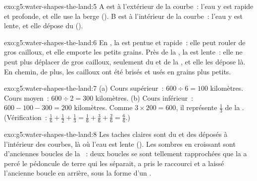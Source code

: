 \begin{solution}{exo:g5:water-shapes-the-land:5}
A est à l'extérieur de la courbe~: l'eau y est rapide et profonde, et elle
use la berge (). B est à l'intérieur de la courbe~: l'eau y est
lente, et elle dépose du  ().
\end{solution}

\begin{solution}{exo:g5:water-shapes-the-land:6}
En , la  est pentue et rapide~: elle peut rouler de gros
cailloux, et elle emporte les petits grains. Près de la , la  est
lente~: elle ne peut plus déplacer de gros cailloux, seulement du  et
de la , et elle les dépose là. En chemin, de plus, les cailloux ont été
brisés et usés en grains plus petits.
\end{solution}

\begin{solution}{exo:g5:water-shapes-the-land:7}
(a) Cours supérieur~: $600 \div 6 = 100$ kilomètres. Cours moyen~:
$600 \div 2 = 300$ kilomètres. (b) Cours inférieur~: $600 - 100 - 300 = 200$
kilomètres. Comme $3 \times 200 = 600$, il représente $\frac{1}{3}$ de la
. (Vérification~: $\frac{1}{6} + \frac{1}{2} + \frac{1}{3} = \frac{1}{6} +
\frac{3}{6} + \frac{2}{6} = \frac{6}{6}$.)
\end{solution}

\begin{solution}{exo:g5:water-shapes-the-land:8}
Les taches claires sont du  et des  déposés à l'intérieur des
courbes, là où l'eau est lente (). Les  sombres en croissant sont
d'anciennes boucles de la ~: deux boucles se sont tellement
rapprochées que la  a percé le pédoncule de terre qui les séparait,
a pris le raccourci et a laissé l'ancienne boucle en arrière, sous la forme
d'un .
\end{solution}

